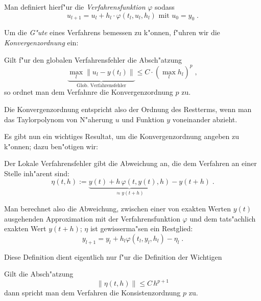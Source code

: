 \documentclass[a4paper]{book}
\newcommand{\abs}{\bigskip \noindent}
\begin{document}
Man definiert hierf"ur die \emph{Verfahrensfunktion} $\varphi$ sodass
\begin{equation}
  \label{eq:23}
  u_{l+1} = u_l + h_l \cdot \varphi( t_l , u_l , h_l ) \text{ mit }
  u_0 = y_0 \;.
\end{equation}



\abs
Um die \emph{G"ute} eines Verfahrens bemessen zu k"onnen, f"uhren wir
die \emph{Konvergenzordnung} ein:
\begin{Def}
Gilt f"ur den globalen Verfahrensfehler die Absch"atzung
\begin{equation}
  \label{eq:24}
  \underbrace{\max_l \| u_l - y(t_l) \|}_\text{Glob. Verfahrensfehler}
  \leq C \cdot \left( \max_l h_l \right)^p \;,
\end{equation}
so ordnet man dem Verfahnre die Konvergenzordnung $p$ zu.
\end{Def}
Die Konvergenzordnung entspricht also der Ordnung des Restterms, wenn
man das Taylorpolynom von N"aherung $u$ und Funktion $y$ voneinander
abzieht.

Es gibt nun ein wichtiges Resultat, um die Konvergenzordnung angeben
zu k"onnen; dazu ben"otigen wir:
\begin{Def}
Der Lokale Verfahrensfehler gibt die Abweichung an, die dem Verfahren
an einer Stelle inh"arent sind:
\begin{equation}
  \label{eq:25}
  \eta(t,h) :=  \underbrace{ y(t) + h \, \varphi( t, y(t) , h)
  }_{\approx y(t+h) } - y(t+h) \;.
\end{equation}
\end{Def}
Man berechnet also die Abweichung, zwischen einer von exakten Werten
$y(t)$ ausgehenden Approximation  mit der Verfahrensfunktion $\varphi$
und dem tats"achlich exakten Wert $y(t+h)$; $\eta$ ist gewisserma"sen
ein Restglied:
\begin{equation*}
  y_{l+1} = y_l + h_l \varphi(t_l, y_l, h_l) - \eta_l \;.
\end{equation*}

Diese Definition dient eigentlich nur f"ur die Definition der
Wichtigen
\begin{Def}
Gilt die Absch"atzung
\begin{equation}
  \label{eq:65}
  \| \eta( t , h ) \| \leq C \, h^{p+1}
\end{equation}
dann spricht man dem Verfahren die Konsistenzordnung $p$ zu.
\end{Def}
\end{document}
